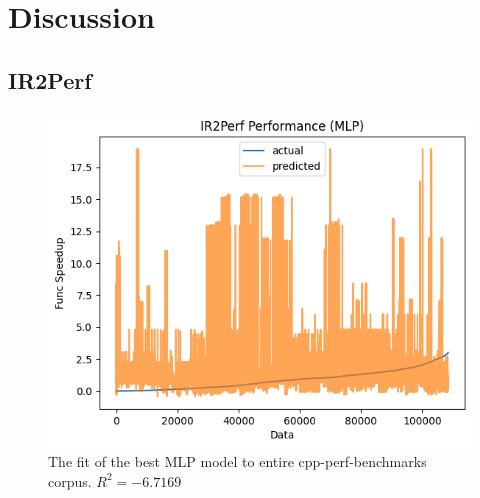 \documentclass[nohyperref]{article}
\theoremstyle{plain}
\theoremstyle{definition}
\theoremstyle{remark}
\begin{document}



\section{Discussion}
\label{discussion}
\subsection{IR2Perf}
\begin{figure}[h!]
    \centerline{\includegraphics[width=\columnwidth]{mlp-fit}}
    \caption{The fit of the best MLP model to entire cpp-perf-benchmarks corpus. $R^2 = -6.7169$}
    \label{fig:mlp-fit}
\end{figure}
\end{document}
